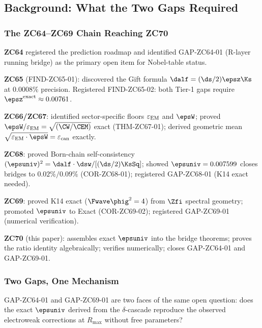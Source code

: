 \documentclass[12pt, a4paper]{article}
\renewcommand{\epsEM}{\varepsilon_{\rm EM}}
\renewcommand{\epscan}{\varepsilon_{\rm can}}
\begin{document}
\tableofcontents
\newpage

\subsection{Background: What the Two Gaps Required}
\label{sec:background}

\subsubsection{The ZC64--ZC69 Chain Reaching ZC70}

\begin{keybox}[title={The Accumulated Pillars: ZC64 Through ZC69}]
\textbf{ZC64} registered the prediction roadmap and identified
GAP-ZC64-01 (R-layer running bridge) as the primary open item
for Nobel-table status.

\textbf{ZC65} (FIND-ZC65-01): discovered the Gift formula
$\dalf = (\ds/2)\epsz\Ks$ at $0.0008\%$ precision.
Registered FIND-ZC65-02: both Tier-1 gaps require
$\epsz^{\rm exact} \approx 0.00761$.

\textbf{ZC66/ZC67}: identified sector-specific floors $\epsEM$
and $\epsW$; proved $\epsW/\epsEM = \sqrt{(\CW/\CEM)}$ exact
(THM-ZC67-01); derived geometric mean $\sqrt{\epsEM\cdot\epsW}
= \epscan$ exactly.

\textbf{ZC68}: proved Born-chain self-consistency
$(\epsuniv)^2 = \dalf\cdot\dsw/[(\ds/2)\KsSq]$;
showed $\epsuniv = 0.007599$ closes bridges to $0.02\%/0.09\%$
(COR-ZC68-01); registered GAP-ZC68-01 (K14 exact needed).

\textbf{ZC69}: proved K14 exact ($\Fwave\phig^2 = 4$) from
$\Zfi$ spectral geometry; promoted $\epsuniv$ to Exact
(COR-ZC69-02); registered GAP-ZC69-01 (numerical verification).

\textbf{ZC70} (this paper): assembles exact $\epsuniv$ into
the bridge theorems; proves the ratio identity algebraically;
verifies numerically; closes GAP-ZC64-01 and GAP-ZC69-01.
\end{keybox}

\subsubsection{Two Gaps, One Mechanism}

GAP-ZC64-01 and GAP-ZC69-01 are two faces of the same
open question: does the exact $\epsuniv$ derived from
the $\delta$-cascade reproduce the observed electroweak
corrections at $R_{\max}$ without free parameters?
\end{document}
